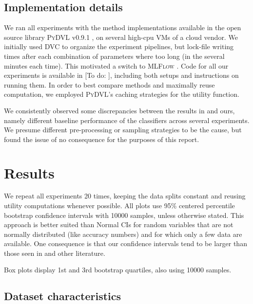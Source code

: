 \documentclass[10pt]{article}
\newcommand{\tmname}[1]{\textsc{#1}}
\newcommand{\todo}[1]{{\color{red!75!black}[To do: #1]}}
\begin{document}
\subsection{Implementation details}

We ran all experiments with the method implementations available in the open
source library {\tmname{PyDVL}} v0.9.1 {\citep{transferlab_pydvl_2022}}, on
several high-cpu VMs of a cloud vendor. We initially used {\tmname{DVC}} to
organize the experiment pipelines, but lock-file writing times after each
combination of parameters where too long (in the several minutes each time).
This motivated a switch to {\tmname{MLFlow}} {\citep{wilson_mlflow_2023}}.
Code for all our experiments is available in {\todo{}}, including both setups
and instructions on running them. In order to best compare methods and
maximally reuse computation, we employed {\tmname{PyDVL}}'s caching strategies
for the utility function.

We consistently observed some discrepancies between the results in
{\cite{schoch_csshapley_2022}} and ours, namely different baseline
performance of the classifiers across several experiments. We presume
different pre-processing or sampling strategies to be the cause, but found the
issue of no consequence for the purposes of this report.

\section{Results}\label{sec:results}

We repeat all experiments 20 times, keeping the data splits constant and
reusing utility computations whenever possible. All plots use 95\% centered
percentile bootstrap confidence intervals with 10000 samples, unless otherwise
stated. This approach is better suited than Normal CIs for random variables
that are not normally distributed (like accuracy numbers) and for which only a
few data are available. One consequence is that our confidence intervals tend
to be larger than those seen in {\cite{schoch_csshapley_2022}} and other
literature.

Box plots display 1st and 3rd bootstrap quartiles, also using 10000 samples.

\subsection{Dataset characteristics}\label{sec:dataset-characteristics}
\end{document}

